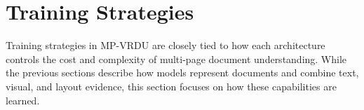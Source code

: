 \documentclass[11pt]{article}
\begin{document}

\section{Training Strategies}
Training strategies in MP-VRDU are closely tied to how each architecture controls the cost and complexity of multi-page document understanding. While the previous sections describe how models represent documents and combine text, visual, and layout evidence, this section focuses on how these capabilities are learned.
\end{document}
